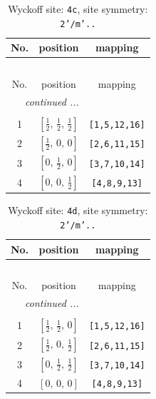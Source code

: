 \documentclass[fleqn,8pt]{jsarticle}
\begin{document}
\renewcommand{\arraystretch}{1.2}
\begin{longtable}{ccc}
\caption{Wyckoff site: {\tt 4c}, site symmetry: {\tt 2'/m'..}}
 \\
 \hline \hline
No. & position & mapping \\ \hline \endfirsthead

\multicolumn{2}{l}{\tablename\ \thetable{}} \\
 \hline \hline
No. & position & mapping \\ \hline \endhead

 \hline \hline
\multicolumn{2}{r}{\footnotesize\it continued ...} \\ \endfoot

 \hline \hline
\multicolumn{2}{r}{} \\ \endlastfoot

1 & $\left[ \frac{1}{2},\, \frac{1}{2},\, \frac{1}{2} \right]$ & {\tt [1,5,12,16]} \\ \hline
2 & $\left[ \frac{1}{2},\, 0,\, 0 \right]$ & {\tt [2,6,11,15]} \\ \hline
3 & $\left[ 0,\, \frac{1}{2},\, 0 \right]$ & {\tt [3,7,10,14]} \\ \hline
4 & $\left[ 0,\, 0,\, \frac{1}{2} \right]$ & {\tt [4,8,9,13]} \\
\end{longtable}
\renewcommand{\arraystretch}{1.2}
\begin{longtable}{ccc}
\caption{Wyckoff site: {\tt 4d}, site symmetry: {\tt 2'/m'..}}
 \\
 \hline \hline
No. & position & mapping \\ \hline \endfirsthead

\multicolumn{2}{l}{\tablename\ \thetable{}} \\
 \hline \hline
No. & position & mapping \\ \hline \endhead

 \hline \hline
\multicolumn{2}{r}{\footnotesize\it continued ...} \\ \endfoot

 \hline \hline
\multicolumn{2}{r}{} \\ \endlastfoot

1 & $\left[ \frac{1}{2},\, \frac{1}{2},\, 0 \right]$ & {\tt [1,5,12,16]} \\ \hline
2 & $\left[ \frac{1}{2},\, 0,\, \frac{1}{2} \right]$ & {\tt [2,6,11,15]} \\ \hline
3 & $\left[ 0,\, \frac{1}{2},\, \frac{1}{2} \right]$ & {\tt [3,7,10,14]} \\ \hline
4 & $\left[ 0,\, 0,\, 0 \right]$ & {\tt [4,8,9,13]} \\
\end{longtable}
\end{document}
